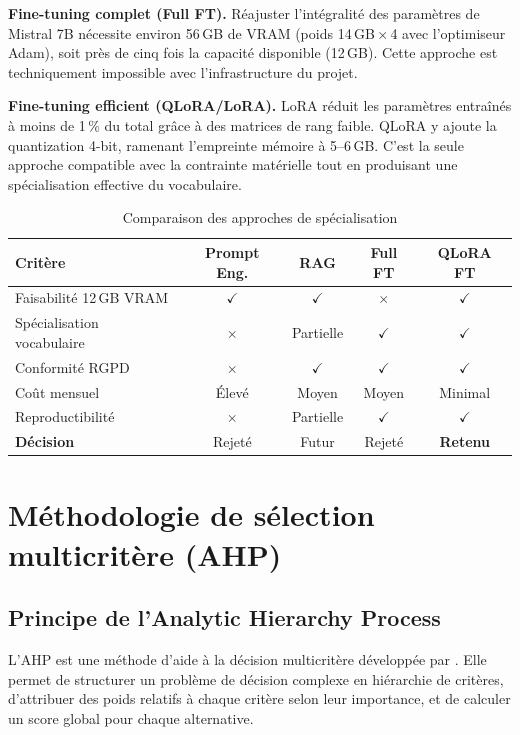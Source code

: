 \textbf{Fine-tuning complet (Full FT).} Réajuster l'intégralité des paramètres de Mistral 7B nécessite environ 56\,GB de VRAM (poids 14\,GB\,×\,4 avec l'optimiseur Adam), soit près de cinq fois la capacité disponible (12\,GB). Cette approche est techniquement impossible avec l'infrastructure du projet.

\textbf{Fine-tuning efficient (QLoRA/LoRA).} LoRA \citep{hu2021lora} réduit les paramètres entraînés à moins de 1\,\% du total grâce à des matrices de rang faible. QLoRA \citep{dettmers2023qlora} y ajoute la quantization 4-bit, ramenant l'empreinte mémoire à 5--6\,GB. C'est la seule approche compatible avec la contrainte matérielle tout en produisant une spécialisation effective du vocabulaire.

\begin{table}[ht]
\centering
\caption{Comparaison des approches de spécialisation}
\label{tab:comparaison_approches}
\begin{tabular}{@{}lcccc@{}}
\toprule
\textbf{Critère} & \textbf{Prompt Eng.} & \textbf{RAG} & \textbf{Full FT} & \textbf{QLoRA FT} \\ \midrule
Faisabilité 12\,GB VRAM & $\checkmark$ & $\checkmark$ & $\times$ & $\checkmark$ \\
Spécialisation vocabulaire & $\times$ & Partielle & $\checkmark$ & $\checkmark$ \\
Conformité RGPD & $\times$ & $\checkmark$ & $\checkmark$ & $\checkmark$ \\
Coût mensuel & Élevé & Moyen & Moyen & Minimal \\
Reproductibilité & $\times$ & Partielle & $\checkmark$ & $\checkmark$ \\
\midrule
\textbf{Décision} & Rejeté & Futur & Rejeté & \textbf{Retenu} \\
\bottomrule
\end{tabular}
\end{table}



\section{Méthodologie de sélection multicritère (AHP)}

\subsection{Principe de l'Analytic Hierarchy Process}

L'AHP est une méthode d'aide à la décision multicritère développée par \citet{saaty1980ahp}. Elle permet de structurer un problème de décision complexe en hiérarchie de critères, d'attribuer des poids relatifs à chaque critère selon leur importance, et de calculer un score global pour chaque alternative.

